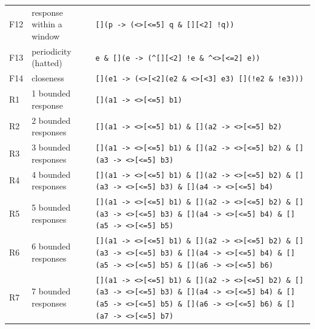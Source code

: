 \begin{table}[t]
\begin{tabular}{@{}llp{}@{}}
F12 & response within a window & \texttt{[](p -\textgreater{} (\textless{}\textgreater{}[\textless{}=5] q \& [][\textless{}2] !q))}\\
F13 & periodicity (hatted) & \texttt{e \& [](e -\textgreater{} (\^{}[][\textless{}2] !e \& \^{}\textless{}\textgreater{}[\textless{}=2] e))}\\
F14 & closeness & \texttt{[](e1 -\textgreater{} (\textless{}\textgreater{}[\textless{}2](e2 \& \textless{}\textgreater{}[\textless{}3] e3) \textbar{} [](!e2 \& !e3)))}\\
R1 & 1 bounded response & \texttt{[](a1 -\textgreater{} \textless{}\textgreater{}[\textless{}=5] b1)}\\
R2 & 2 bounded responses & \texttt{[](a1 -\textgreater{} \textless{}\textgreater{}[\textless{}=5] b1) \& [](a2 -\textgreater{} \textless{}\textgreater{}[\textless{}=5] b2)}\\
R3 & 3 bounded responses & \texttt{[](a1 -\textgreater{} \textless{}\textgreater{}[\textless{}=5] b1) \& [](a2 -\textgreater{} \textless{}\textgreater{}[\textless{}=5] b2) \& [](a3 -\textgreater{} \textless{}\textgreater{}[\textless{}=5] b3)}\\
R4 & 4 bounded responses & \texttt{[](a1 -\textgreater{} \textless{}\textgreater{}[\textless{}=5] b1) \& [](a2 -\textgreater{} \textless{}\textgreater{}[\textless{}=5] b2) \& [](a3 -\textgreater{} \textless{}\textgreater{}[\textless{}=5] b3) \& [](a4 -\textgreater{} \textless{}\textgreater{}[\textless{}=5] b4)}\\
R5 & 5 bounded responses & \texttt{[](a1 -\textgreater{} \textless{}\textgreater{}[\textless{}=5] b1) \& [](a2 -\textgreater{} \textless{}\textgreater{}[\textless{}=5] b2) \& [](a3 -\textgreater{} \textless{}\textgreater{}[\textless{}=5] b3) \& [](a4 -\textgreater{} \textless{}\textgreater{}[\textless{}=5] b4) \& [](a5 -\textgreater{} \textless{}\textgreater{}[\textless{}=5] b5)}\\
R6 & 6 bounded responses & \texttt{[](a1 -\textgreater{} \textless{}\textgreater{}[\textless{}=5] b1) \& [](a2 -\textgreater{} \textless{}\textgreater{}[\textless{}=5] b2) \& [](a3 -\textgreater{} \textless{}\textgreater{}[\textless{}=5] b3) \& [](a4 -\textgreater{} \textless{}\textgreater{}[\textless{}=5] b4) \& [](a5 -\textgreater{} \textless{}\textgreater{}[\textless{}=5] b5) \& [](a6 -\textgreater{} \textless{}\textgreater{}[\textless{}=5] b6)}\\
R7 & 7 bounded responses & \texttt{[](a1 -\textgreater{} \textless{}\textgreater{}[\textless{}=5] b1) \& [](a2 -\textgreater{} \textless{}\textgreater{}[\textless{}=5] b2) \& [](a3 -\textgreater{} \textless{}\textgreater{}[\textless{}=5] b3) \& [](a4 -\textgreater{} \textless{}\textgreater{}[\textless{}=5] b4) \& [](a5 -\textgreater{} \textless{}\textgreater{}[\textless{}=5] b5) \& [](a6 -\textgreater{} \textless{}\textgreater{}[\textless{}=5] b6) \& [](a7 -\textgreater{} \textless{}\textgreater{}[\textless{}=5] b7)}\\

\end{tabular}
\end{table}

